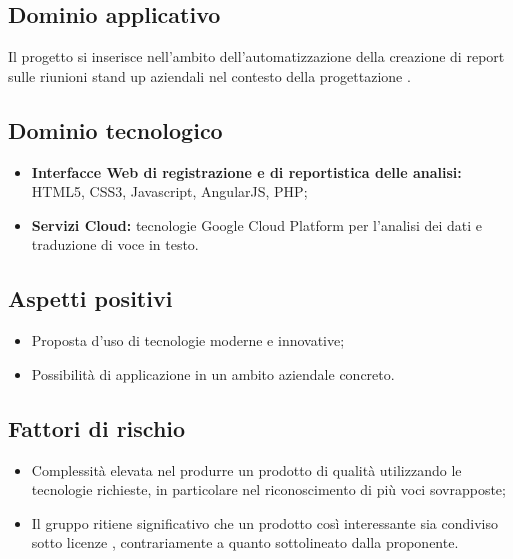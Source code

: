 \documentclass[openany,12pt,a4paper]{report}
\begin{document}
\subsection{Dominio applicativo}

Il progetto si inserisce nell'ambito dell'automatizzazione della creazione di report sulle riunioni stand up aziendali nel contesto della progettazione .

\subsection{Dominio tecnologico}

\begin{itemize}
    \item \textbf{Interfacce Web di registrazione e di reportistica delle analisi:} HTML5, CSS3, Javascript, AngularJS, PHP;
    
    \item \textbf{Servizi Cloud:} tecnologie Google Cloud Platform per l’analisi dei dati e traduzione di voce in testo.
\end{itemize}

\subsection{Aspetti positivi}

\begin{itemize}
    \item Proposta d'uso di tecnologie moderne e innovative;
    
    \item Possibilità di applicazione in un ambito aziendale concreto.
\end{itemize}

\subsection{Fattori di rischio}

\begin{itemize}
    \item Complessità elevata nel produrre un prodotto di qualità utilizzando le tecnologie richieste, in particolare nel riconoscimento di più voci sovrapposte;
    
    \item Il gruppo ritiene significativo che un prodotto così interessante sia condiviso sotto licenze , contrariamente a quanto sottolineato dalla proponente.
\end{itemize}
\end{document}
